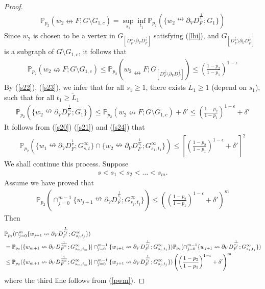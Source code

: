 \documentclass[11pt]{amsart}
\theoremstyle{plain}
\numberwithin{equation}{section}
\numberwithin{figure}{section}
\newcommand\PP{{\mathbb P}}
\begin{document}
\begin{proof}
\begin{align}
\PP_{p_2}(w_2\nleftrightarrow F; G\setminus G_{1,c})=
\sup_{s_1}\inf_{t_1}\PP_{p_2}(\{w_2\nleftrightarrow \partial_V D_F^{\frac{1}{s_1}};G_1\})\label{s22}
\end{align}
Since $w_2$ is chosen to be a vertex in $G_{\left[D_{F}^{\frac{1}{s}}\setminus \partial_VD_{F}^{\frac{1}{s}}\right]}$ satisfying (\ref{lbi}), and $G_{\left[D_{F}^{\frac{1}{s}}\setminus \partial_VD_{F}^{\frac{1}{s}}\right]}$ is a subgraph of $G\setminus G_{1,c}$, it follows that 
\begin{align}
\PP_{p_2}(w_2\nleftrightarrow F; G\setminus G_{1,c})\leq \PP_{p_2}\left(w_2\nleftrightarrow F; G_{\left[D_{F}^{\frac{1}{s}}\setminus \partial_VD_{F}^{\frac{1}{s}}\right]}\right)\leq\left(\frac{1-p_2}{1-p_1}\right)^{1-\epsilon}\label{s23}
\end{align}
By (\ref{s22}), (\ref{s23}), we infer that for all $s_1\geq 1$, there exists $\tilde{L}_1\geq 1$ (depend on $s_1$), such that for all $t_1\geq \tilde{L}_1$
\begin{align}
 \PP_{p_2}(\{w_2\nleftrightarrow \partial_V D_F^{\frac{1}{s_1}};G_1\})\le \PP_{p_2}(w_2\nleftrightarrow F;G\setminus G_{1,c})+\delta'\leq \left(\frac{1-p_2}{1-p_1}\right)^{1-\epsilon}+\delta'\label{s24}
\end{align}
It follows from (\ref{s20}) (\ref{s21}) and (\ref{s24}) that
\begin{align*}
\PP_{p_2}(\{w_1\nleftrightarrow \partial_V D_F^{\frac{1}{s}};G_{s,t}^{\infty}\}\cap \{w_2\nleftrightarrow \partial_V D_F^{\frac{1}{s_1}};G_{s_1,t_1}^{\infty}\})\leq \left[\left(\frac{1-p_2}{1-p_1}\right)^{1-\epsilon}+\delta'\right]^2
\end{align*}
We shall continue this process. Suppose
\begin{align}
s<s_1<s_2<\ldots<s_{m}.\label{sic}
\end{align}
Assume we have proved that 
\begin{align}
\PP_{p_2}(\cap_{j=0}^{m-1}\{w_{j+1}\nleftrightarrow \partial_V D_F^{\frac{1}{s_j}};G_{s_j,t_j}^{\infty}\})\leq 
\left(\left(\frac{1-p_2}{1-p_1}\right)^{1-\epsilon}+\delta'\right)^{m}\label{pwm}
\end{align}
Then 
\begin{align}
\label{s20m}
&\PP_{p_2}(\cap_{j=0}^{m}\{w_{j+1}\nleftrightarrow \partial_V D_F^{\frac{1}{s_j}};G_{s_j,t_j}^{\infty}\})\\
&=\PP_{p_2}(\{w_{m+1}\nleftrightarrow \partial_V D_F^{\frac{1}{s_m}};G_{s_m,t_m}^{\infty}\}|\cap_{j=0}^{m-1}\{w_{j+1}\nleftrightarrow \partial_V D_F^{\frac{1}{s_j}};G_{s_j,t_j}^{\infty}\})\PP_{p_2}(\cap_{j=0}^{m-1}\{w_{j+1}\nleftrightarrow \partial_V D_F^{\frac{1}{s_j}};G_{s_j,t_j}^{\infty}\})\notag\\
&\leq \PP_{p_2}(\{w_{m+1}\nleftrightarrow \partial_V D_F^{\frac{1}{s_m}};G_{s_m,t_m}^{\infty}\}|\cap_{j=0}^{m-1}\{w_{j+1}\nleftrightarrow \partial_V D_F^{\frac{1}{s_j}};G_{s_j,t_j}^{\infty}\})\left(\left(\frac{1-p_2}{1-p_1}\right)^{1-\epsilon}+\delta'\right)^{m}\notag
\end{align}
where the third line follows from (\ref{pwm}).


\end{proof}
\end{document}
